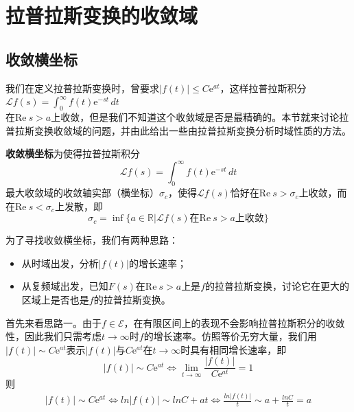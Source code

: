 \section{拉普拉斯变换的收敛域}\label{Convergence}

\subsection{收敛横坐标}\label{sub:converge_abscissa}
我们在定义拉普拉斯变换时，曾要求$|f(t)|\leq C \mathrm{e}^{at}$，这样拉普拉斯积分$\mathcal{L} f(s)=\int_{0}^{\infty}f(t)\mathrm{e}^{-st}\,dt$\\
在$\text{Re}\ s>a$上收敛，但是我们不知道这个收敛域是否是最精确的。本节就来讨论拉普拉斯变换收敛域的问题，并由此给出一些由拉普拉斯变换分析时域性质的方法。

\begin{definition}[收敛横坐标]
    \textbf{收敛横坐标}为使得拉普拉斯积分$$\mathcal{L} f(s)=\int_{0}^{\infty}f(t)\mathrm{e}^{-st}\,dt$$最大收敛域的收敛轴实部（横坐标）$\sigma_c$，使得$\mathcal{L} f(s)$恰好在$\text{Re}\ s>\sigma_c$上收敛，而在$\text{Re}\ s<\sigma_c$上发散，即
    \[\sigma_c=\inf\{a\in\mathbb{R}|\mathcal{L} f(s)\text{在}\text{Re}\ s>a\text{上收敛}\}\]
\end{definition}

为了寻找收敛横坐标，我们有两种思路：
\begin{itemize}
    \item 从时域出发，分析$|f(t)|$的增长速率；
    \item 从复频域出发，已知$F(s)$在$\text{Re}\ s>a$上是$f$的拉普拉斯变换，讨论它在更大的区域上是否也是$f$的拉普拉斯变换。
\end{itemize}

首先来看思路一。由于$f\in\mathcal{E} $，在有限区间上的表现不会影响拉普拉斯积分的收敛性，因此我们只需考虑$t\to\infty$时$f$的增长速率。仿照等价无穷大量，我们用$|f(t)|\sim C \mathrm{e}^{a t}$表示$|f(t)|$与$C \mathrm{e}^{a t}$在$t\to\infty$时具有相同增长速率，即
\[|f(t)|\sim C \mathrm{e}^{a t}\iff \lim_{t\to\infty}\frac{|f(t)|}{C \mathrm{e}^{a t}}=1\]
则\begin{align*}
    |f(t)|\sim C \mathrm{e}^{a t}\iff ln|f(t)|\sim ln C +a t\iff\frac{ln|f(t)|}{t}\sim a +\frac{ln C}{t}=a
\end{align*}

